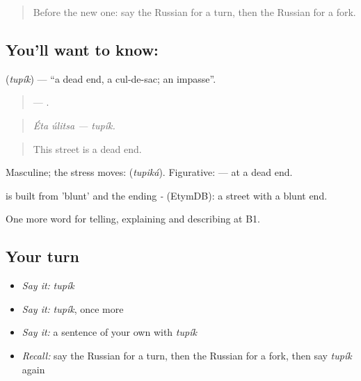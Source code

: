 \label{lesson:RU-C439-tupik}



\begin{quote}
Before the new one: say the Russian for a turn, then the Russian for a fork.
\end{quote}

\subsection*{You'll want to know: }
\textbf{} (\emph{tupík}) — \textquotedblleft{}a dead end, a cul-de-sac; an impasse\textquotedblright{}.

\begin{quote}
  — .
\end{quote}

\begin{quote}
\emph{Éta úlitsa — tupík.}
\end{quote}

\begin{quote}
This street is a dead end.
\end{quote}

Masculine; the stress moves: \emph{} (\emph{tupiká}). Figurative: \emph{ } — at a dead end.

\begin{cousinweb}
\emph{} is built from \emph{} 'blunt' and the ending \emph{-} (EtymDB): a street with a blunt end.
\end{cousinweb}

\begin{grammarlens}[title={What you've built}]
One more word for telling, explaining and describing at B1.
\end{grammarlens}

\subsection*{Your turn}
\begin{itemize}
\raggedright
  \item \emph{Say it:} \emph{tupík}
  \item \emph{Say it:} \emph{tupík}, once more
  \item \emph{Say it:} a sentence of your own with \emph{tupík}
  \item \emph{Recall:} say the Russian for a turn, then the Russian for a fork, then say \emph{tupík} again
\end{itemize}

